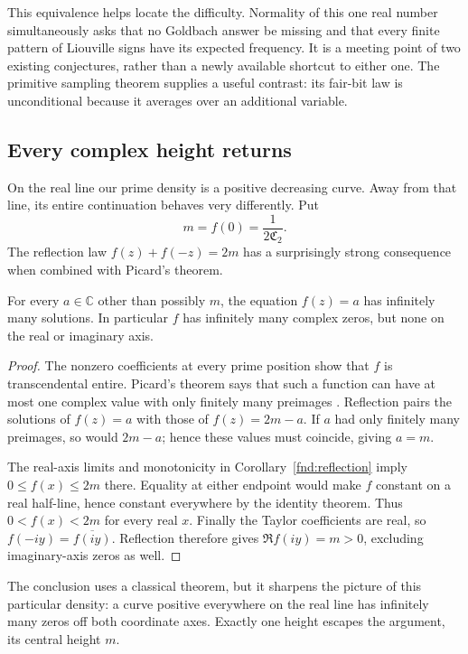 This equivalence helps locate the difficulty.  Normality of this one
real number simultaneously asks that no Goldbach answer be missing
and that every finite pattern of Liouville signs have its expected
frequency.  It is a meeting point of two existing conjectures, rather
than a newly available shortcut to either one.  The primitive
sampling theorem supplies a useful contrast: its fair-bit law is
unconditional because it averages over an additional variable.


\subsection{Every complex height returns}

On the real line our prime density is a positive decreasing curve.
Away from that line, its entire continuation behaves very differently.
Put
\[
 m=f(0)=\frac1{2\mathfrak C_2}.
\]
The reflection law $f(z)+f(-z)=2m$ has a surprisingly strong
consequence when combined with Picard's theorem.

\begin{proposition}\label{play:picard}
For every $a\in\mathbb C$ other than possibly $m$, the equation
$f(z)=a$ has infinitely many solutions.  In particular $f$ has
infinitely many complex zeros, but none on the real or imaginary
axis.
\end{proposition}
\begin{proof}
The nonzero coefficients at every prime position show that $f$ is
transcendental entire.  Picard's theorem says that such a function
can have at most one complex value with only finitely many
preimages \cite[Chapter II, Section 9]{playPicard1880}.  Reflection
pairs the solutions of $f(z)=a$ with those of $f(z)=2m-a$.
If $a$ had only finitely many preimages, so would $2m-a$;
hence these values must coincide, giving $a=m$.

The real-axis limits and monotonicity in
Corollary~\ref{fnd:reflection} imply $0\le f(x)\le2m$ there.
Equality at either endpoint would make $f$ constant on a real
half-line, hence constant everywhere by the identity theorem.
Thus $0<f(x)<2m$ for every real $x$.  Finally the Taylor
coefficients are real, so
$f(-iy)=\overline{f(iy)}$.  Reflection therefore gives
$\Re f(iy)=m>0$, excluding imaginary-axis zeros as well.
\end{proof}

The conclusion uses a classical theorem, but it sharpens the picture
of this particular density: a curve positive everywhere on the real
line has infinitely many zeros off both coordinate axes.  Exactly
one height escapes the argument, its central height $m$.

